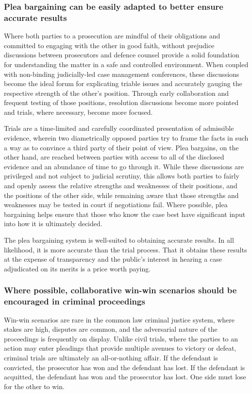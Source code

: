 \subsubsection{Plea bargaining can be easily adapted to better ensure accurate results}

Where both parties to a prosecution are mindful of their obligations and committed to engaging with the other in good faith, without prejudice discussions between prosecutors and defence counsel provide a solid foundation for understanding the matter in a safe and controlled environment. When coupled with non-binding judicially-led case management conferences, these discussions become the ideal forum for explicating triable issues and accurately gauging the respective strength of the other's position. Through early collaboration and frequent testing of those positions, resolution discussions become more pointed and trials, where necessary, become more focused. 

Trials are a time-limited and carefully coordinated presentation of admissible evidence, wherein two diametrically opposed parties try to frame the facts in such a way as to convince a third party of their point of view. Plea bargains, on the other hand, are reached between parties with access to all of the disclosed evidence and an abundance of time to go through it. While these discussions are privileged and not subject to judicial scrutiny, this allows both parties to fairly and openly assess the relative strengths and weaknesses of their positions, and the positions of the other side, while remaining aware that those strengths and weaknesses may be tested in court if negotiations fail. Where possible, plea bargaining helps ensure that those who know the case best have significant input into how it is ultimately decided.

The plea bargaining system is well-suited to obtaining accurate results. In all likelihood, it is more accurate than the trial process. That it obtains these results at the expense of transparency and the public's interest in hearing a case adjudicated on its merits is a price worth paying.

\subsubsection{Where possible, collaborative win-win scenarios should be encouraged in criminal proceedings}

Win-win scenarios are rare in the common law criminal justice system, where stakes are high, disputes are common, and the adversarial nature of the proceedings is frequently on display. Unlike civil trials, where the parties to an action may enter pleadings that provide multiple avenues to victory or defeat, criminal trials are ultimately an all-or-nothing affair. If the defendant is convicted, the prosecutor has won and the defendant has lost. If the defendant is acquitted, the defendant has won and the prosecutor has lost. One side must lose for the other to win.

